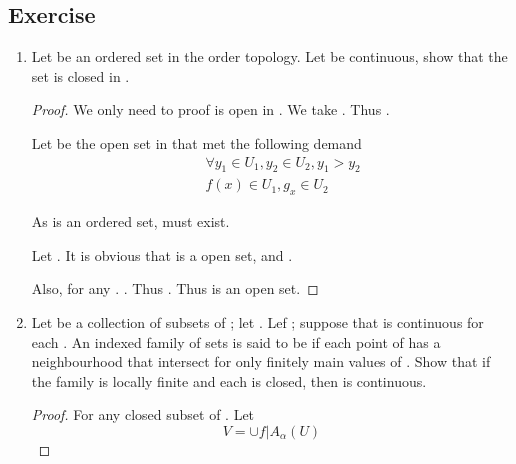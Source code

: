 \subsection{Exercise}

\begin{enumerate}
      \item Let  be an ordered set in the order topology. Let  be continuous, show that the set   is closed in .

      \begin{proof}
            We only need to proof  is open in . We take . Thus .

            Let  be the open set in  that met the following demand
            \begin{eqnarray*}
                  &&\forall y_{1} \in U_{1}, y_{2} \in U_{2}, y_{1} > y_{2} \\
                  &&f(x) \in U_{1}, g_{x} \in U_{2}
            \end{eqnarray*}

            As  is an ordered set,  must exist.

            Let . It is obvious that  is a open set, and .

            Also, for any . . Thus . Thus  is an open set.
      \end{proof}

      \item Let  be a collection of subsets of ; let . Lef ; suppose that  is continuous for each \mt{\alpha}. An indexed family of sets  is said to be \label{def:LocallyFinite} if each point  of  has a neighbourhood that intersect  for only finitely main values of \mt{\alpha}. Show that if the family  is locally finite and each  is closed, then  is continuous.
      
      \begin{proof}
            For any closed subset  of . Let
            \begin{equation*}
                  V = \cup f|A_{\alpha}(U)
            \end{equation*}


\end{proof}
\end{enumerate}
